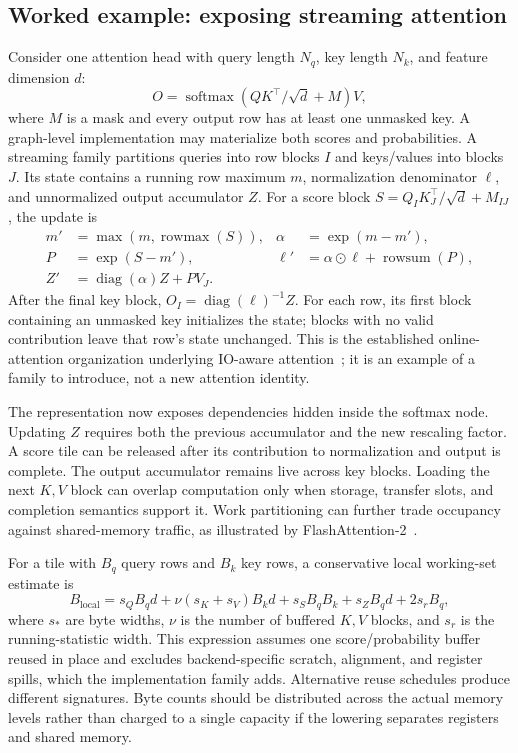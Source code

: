 \subsection{Worked example: exposing streaming attention}\label{sec:attention}
Consider one attention head with query length $N_q$, key length $N_k$, and feature dimension $d$:
\begin{equation}
 O=\operatorname{softmax}\!\left(QK^\top/\sqrt d+M\right)V,\label{eq:attention}
\end{equation}
where $M$ is a mask and every output row has at least one unmasked key. A graph-level implementation may materialize both scores and probabilities. A streaming family partitions queries into row blocks $I$ and keys/values into blocks $J$. Its state contains a running row maximum $m$, normalization denominator $\ell$, and unnormalized output accumulator $Z$. For a score block $S=Q_IK_J^\top/\sqrt d+M_{IJ}$, the update is
\begin{align}
 m' &= \max(m,\operatorname{rowmax}(S)), &
 \alpha &= \exp(m-m'), \nonumber\\
 P &= \exp(S-m'), &
 \ell' &= \alpha\odot\ell+\operatorname{rowsum}(P),\label{eq:online}\\
 Z' &= \operatorname{diag}(\alpha)Z+PV_J.\nonumber
\end{align}
After the final key block, $O_I=\operatorname{diag}(\ell)^{-1}Z$. For each row, its first block containing an unmasked key initializes the state; blocks with no valid contribution leave that row's state unchanged. This is the established online-attention organization underlying IO-aware attention~\cite{flashattention}; it is an example of a family to introduce, not a new attention identity.

The representation now exposes dependencies hidden inside the softmax node. Updating $Z$ requires both the previous accumulator and the new rescaling factor. A score tile can be released after its contribution to normalization and output is complete. The output accumulator remains live across key blocks. Loading the next $K,V$ block can overlap computation only when storage, transfer slots, and completion semantics support it. Work partitioning can further trade occupancy against shared-memory traffic, as illustrated by FlashAttention-2~\cite{flashattention2}.



For a tile with $B_q$ query rows and $B_k$ key rows, a conservative local working-set estimate is
\begin{equation}
 B_{\mathrm{local}}=
 s_QB_qd+\nu(s_K+s_V)B_kd+s_SB_qB_k+s_ZB_qd
 +2s_rB_q,\label{eq:attention-storage}
\end{equation}
where $s_*$ are byte widths, $\nu$ is the number of buffered $K,V$ blocks, and $s_r$ is the running-statistic width. This expression assumes one score/probability buffer reused in place and excludes backend-specific scratch, alignment, and register spills, which the implementation family adds. Alternative reuse schedules produce different signatures. Byte counts should be distributed across the actual memory levels rather than charged to a single capacity if the lowering separates registers and shared memory.

